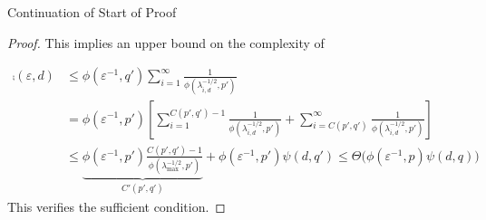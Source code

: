 \documentclass[11pt,compress,xcolor={usenames,dvipsnames},aspectratio=169]{beamer}
\begin{document}
\begin{frame}{Continuation of Start of Proof}
\begin{proof}
\vspace{-3ex}
This implies an upper bound on the complexity of

\vspace{-6ex}
\begin{align*}
       \comp(\varepsilon,d)
       &\le \phi(\varepsilon^{-1},q') \sum_{i=1}^\infty \frac{1}{\phi(\lambda_{i, d}^{-1/2},p')} \\
       & = \phi(\varepsilon^{-1},p') \left [ \sum_{i=1}^{C(p',q')-1} \frac{1}{\phi(\lambda_{i, d}^{-1/2},p')}  + \sum_{i=C(p',q')}^\infty \frac{1}{\phi(\lambda_{i, d}^{-1/2},p')} \right ] \\
       & \le \underbrace{\phi(\varepsilon^{-1},p') \frac{C(p',q')-1}{\phi(\lambda_{\max}^{-1/2},p')}}_{C'(p',q')}
       +  \phi(\varepsilon^{-1},p') \psi(d,q') \le \Theta\bigl(\phi(\varepsilon^{-1},p) \psi(d,q)  \bigr)
\end{align*}
This verifies the sufficient condition.
\end{proof}

\end{frame}
\end{document}
